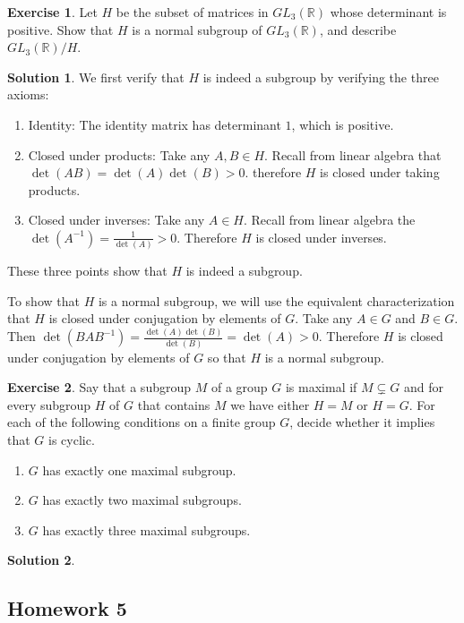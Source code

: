 \documentclass[12pt]{article}
\theoremstyle{definition}
\newtheorem{exercise}{Exercise}
\theoremstyle{definition}
\newtheorem{solution}{Solution}
\newcommand{\R}{\mathbb{R}}
\begin{document}
\begin{exercise}
Let $H$ be the subset of matrices in $GL_3(\R)$ whose determinant is positive. Show that $H$ is a normal subgroup of $GL_3(\R)$, and describe $GL_3(\R) / H$.
\end{exercise}
\begin{solution}
We first verify that $H$ is indeed a subgroup by verifying the three axioms:
\begin{enumerate}
	\item Identity: The identity matrix has determinant $1$, which is positive. 
	\item Closed under products: Take any $A, B \in H$. Recall from linear algebra that $\det(AB) = \det(A)\det(B) > 0$. therefore $H$ is closed under taking products. 
	\item Closed under inverses: Take any $A \in H$. Recall from linear algebra the $\det(A^{-1}) = \frac{1}{\det(A)} > 0$. Therefore $H$ is closed under inverses. 
\end{enumerate}
These three points show that $H$ is indeed a subgroup. 

To show that $H$ is a normal subgroup, we will use the equivalent characterization that $H$ is closed under conjugation by elements of $G$. Take any $A \in G$ and $B \in G$. Then $\det(BAB^{-1}) = \frac{\det(A)\det(B)}{\det(B)} = \det(A) > 0$. Therefore $H$ is closed under conjugation by elements of $G$ so that $H$ is a normal subgroup.   
\end{solution}	

\begin{exercise}
Say that a subgroup $M$ of a group $G$ is maximal if $M \subsetneq G$ and for every subgroup $H$ of $G$ that contains $M$ we have either $H = M$ or $H = G$. For each of the following conditions on a finite group $G$, decide whether it implies that $G$ is cyclic.
\begin{enumerate}
	\item $G$ has exactly one maximal subgroup.
	\item $G$ has exactly two maximal subgroups. 
	\item $G$ has exactly three maximal subgroups. 
\end{enumerate} 
\end{exercise}
\begin{solution}

\end{solution}

\subsection{Homework 5}
\end{document}

